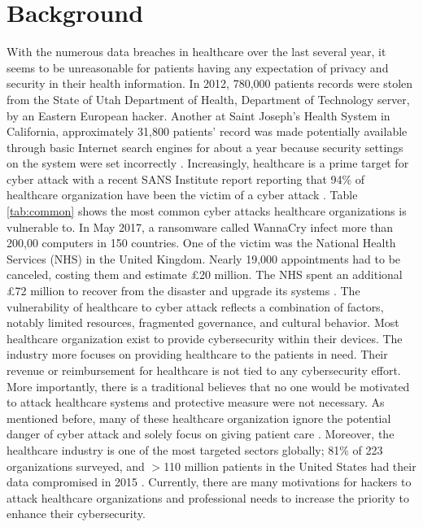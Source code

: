 \documentclass{IEEEtran}
\begin{document}
\section{Background}
With the numerous data breaches in healthcare over the last several year, it seems to be unreasonable for patients having any expectation of privacy and security in their health information. In 2012, 780,000 patients records were stolen from the State of Utah Department of Health, Department of Technology server, by an Eastern European hacker. Another at Saint Joseph's Health System in California, approximately 31,800 patients' record was made potentially available through basic Internet search engines for about a year because security settings on the system were set incorrectly \cite{murphy2015cybersecurity}. Increasingly, healthcare is a prime target for cyber attack with a recent SANS Institute report reporting that 94\% of healthcare organization have been the victim of a cyber attack \cite{williams2015cybersecurity}. Table \ref{tab:common} shows the most common cyber attacks healthcare organizations is vulnerable to. In May 2017, a ransomware called WannaCry infect more than 200,00 computers in 150 countries. One of the victim was the National Health Services (NHS) in the United Kingdom. Nearly 19,000 appointments had to be canceled, costing them and estimate \pounds20 million. The NHS spent an additional \pounds72 million to recover from the disaster and upgrade its systems \cite{ferrara2019cybersecurity} \cite{busdicker2017role}. The vulnerability of healthcare to cyber attack reflects a combination of factors, notably limited resources, fragmented governance, and cultural behavior. Most healthcare organization exist to provide cybersecurity within their devices. The industry more focuses on providing healthcare to the patients in need. Their revenue or reimbursement for healthcare is not tied to any cybersecurity effort. More importantly, there is a traditional believes that no one would be motivated to attack healthcare systems and protective measure were not necessary. As mentioned before, many of these healthcare organization ignore the potential danger of cyber attack and solely focus on giving patient care \cite{coventry2018cybersecurity}. Moreover, the healthcare industry is one of the most targeted sectors globally; 81\% of 223 organizations surveyed, and $>$110 million patients in the United States had their data compromised in 2015 \cite{martin2017cybersecurity}. Currently, there are many motivations for hackers to attack healthcare organizations and professional needs to increase the priority to enhance their cybersecurity. 
 
\end{document}

